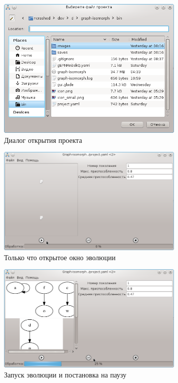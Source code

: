 \documentclass[russian,utf8,emptystyle]{eskdtext}
\begin{document}
\begin{figure}[h!]
\centering
\includegraphics[width=0.8\textwidth]{screen05}
\caption{Диалог открытия проекта}
\label{fig:projectOpenDialog}
\end{figure}

\begin{figure}[h!]
\centering
\includegraphics[width=0.8\textwidth]{screen14}
\caption{Только что открытое окно эволюции}
\label{fig:evolutionWndFresh}
\end{figure}

\begin{figure}[h!]
\centering
\includegraphics[width=0.8\textwidth]{screen15}
\caption{Запуск эволюции и постановка на паузу}
\label{fig:evolutionWndStartPause}
\end{figure}
\end{document}
